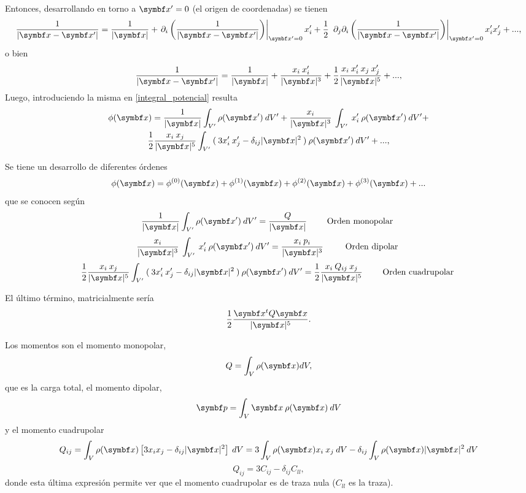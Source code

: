 \documentclass[10pt,oneside]{CBFT_book}
\begin{document}
Entonces, desarrollando en torno a $\vbx'=0$ (el origen de coordenadas) se tienen
\[
	\frac{ 1 }{| \vbx -\vbx' | } = 
	\frac{ 1 }{| \vbx |} + \left.\partial_i \left( \frac{ 1 }{| \vbx -\vbx' | } \right)\right|_{\vbx'=0} x_i' +
	\frac{1}{2} \: \left. \partial_j \partial_i \left( \frac{ 1 }{| \vbx -\vbx' | } \right)\right|_{\vbx'=0} x_i' x_j' + ...,
\]
o bien 
\[
	\frac{ 1 }{| \vbx -\vbx' | } = 
	\frac{ 1 }{| \vbx |} + \frac{x_i \: x_i'}{| \vbx |^3} +
	\frac{1}{2} \frac{ x_i \: x_i' \: x_j \: x_j' }{ | \vbx |^5 } + ...,	
\]
Luego, introduciendo la misma en \eqref{integral_potencial} resulta
\begin{multline*}
 	\phi(\vb{x}) =
	\frac{ 1 }{| \vbx |} \int_{V'} \rho( \vbx' ) \: dV' + 
	\frac{x_i }{| \vbx |^3} \: \int_{V'} \: x_i' \: \rho( \vbx' ) \: dV' + \\
	\frac{1}{2} \frac{ x_i  \: x_j  }{ | \vbx |^5 } 
	\int_{V'} \: (\: 3 x_i' \: x_j' - \delta_{ij}|\vbx|^2 \:) \: \rho( \vbx' ) \: dV' + ...,
\end{multline*}

Se tiene un desarrollo de diferentes órdenes 
\[
	\phi(\vb{x}) = \phi^{(0)}(\vbx) + \phi^{(1)}(\vbx) + \phi^{(2)}(\vbx) + \phi^{(3)}(\vbx) + ...
\]
que se conocen según
\[
	\frac{ 1 }{| \vbx |} \int_{V'} \rho( \vbx' ) \: dV' = \frac{ Q }{| \vbx |} \qquad \text{ Orden monopolar }
\]
\[
	\frac{x_i }{| \vbx |^3} \: \int_{V'} \: x_i' \: \rho( \vbx' ) \: dV' = 
	\frac{x_i \: p_i }{| \vbx |^3} \: \qquad \text{ Orden dipolar }
\]
\[
	\frac{1}{2} \frac{ x_i  \: x_j  }{ | \vbx |^5 } 
	\int_{V'} \: (\: 3 x_i' \: x_j' - \delta_{ij}|\vbx|^2 \:) \: \rho( \vbx' ) \: dV' =
	\frac{1}{2} \frac{ x_i  \: Q_{ij} \: x_j  }{ | \vbx |^5 } \qquad \text{ Orden cuadrupolar }
\]

El último término, matricialmente sería
\[
	\frac{1}{2} \frac{\vb{x}^t Q \vb{x}}{|\vb{x}|^5}.
\]

Los momentos son el momento monopolar,
\[
	Q = \int_V \rho(\vb{x}) dV, 
\]
que es la carga total, el momento dipolar,
\[
	\vb{p} = \int_V \vb{x} \: \rho(\vb{x}) \: dV
\]
y el momento cuadrupolar
\[
	Q_{ij} = \int_V  \rho(\vb{x}) \left[ 3 x_i x_j - \delta_{ij} |\vb{x}|^2 \right] \: dV
	= 3 \int_V  \rho(\vb{x}) x_i \: x_j  \: dV - \delta_{ij} \int_V  \rho(\vb{x})  |\vb{x}|^2  \: dV
\]
\[
	Q_{ij} = 3 C_{ij} - \delta_{ij} C_{ll},
\]
donde esta última expresión permite ver que el momento cuadrupolar es de traza nula ($C_{ll}$ es la traza).
\end{document}
